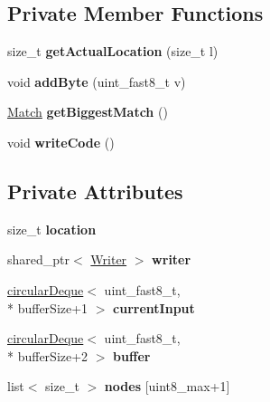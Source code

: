 \subsection*{Private Member Functions}
\begin{DoxyCompactItemize}
\item 
\hypertarget{classCompressWriter_ab0fa055ce027b0f5be42531a285e2217}{size\+\_\+t {\bfseries get\+Actual\+Location} (size\+\_\+t l)}\label{classCompressWriter_ab0fa055ce027b0f5be42531a285e2217}

\item 
\hypertarget{classCompressWriter_a7c45f54c89b0e3ddac53f4ee95effa41}{void {\bfseries add\+Byte} (uint\+\_\+fast8\+\_\+t v)}\label{classCompressWriter_a7c45f54c89b0e3ddac53f4ee95effa41}

\item 
\hypertarget{classCompressWriter_a4e97ecc6a294aa87d685ce422cef6c56}{\hyperlink{structCompressWriter_1_1Match}{Match} {\bfseries get\+Biggest\+Match} ()}\label{classCompressWriter_a4e97ecc6a294aa87d685ce422cef6c56}

\item 
\hypertarget{classCompressWriter_ab958684312e2c0b9be302a1331410210}{void {\bfseries write\+Code} ()}\label{classCompressWriter_ab958684312e2c0b9be302a1331410210}

\end{DoxyCompactItemize}
\subsection*{Private Attributes}
\begin{DoxyCompactItemize}
\item 
\hypertarget{classCompressWriter_ad0c42284addda151ec815efa9eb1b333}{size\+\_\+t {\bfseries location}}\label{classCompressWriter_ad0c42284addda151ec815efa9eb1b333}

\item 
\hypertarget{classCompressWriter_afa45b760576d6845b4f955ea486d603c}{shared\+\_\+ptr$<$ \hyperlink{classWriter}{Writer} $>$ {\bfseries writer}}\label{classCompressWriter_afa45b760576d6845b4f955ea486d603c}

\item 
\hypertarget{classCompressWriter_a4a42d0a68afca7b21ac9edea6a6d465e}{\hyperlink{classcircularDeque}{circular\+Deque}$<$ uint\+\_\+fast8\+\_\+t, \\*
buffer\+Size+1 $>$ {\bfseries current\+Input}}\label{classCompressWriter_a4a42d0a68afca7b21ac9edea6a6d465e}

\item 
\hypertarget{classCompressWriter_a6dea17049f70649520ca9fd02931a5e1}{\hyperlink{classcircularDeque}{circular\+Deque}$<$ uint\+\_\+fast8\+\_\+t, \\*
buffer\+Size+2 $>$ {\bfseries buffer}}\label{classCompressWriter_a6dea17049f70649520ca9fd02931a5e1}

\item 
\hypertarget{classCompressWriter_a130499c9d22e1461044dd4316edfb50c}{list$<$ size\+\_\+t $>$ {\bfseries nodes} \mbox{[}uint8\+\_\+max+1\mbox{]}}\label{classCompressWriter_a130499c9d22e1461044dd4316edfb50c}

\end{DoxyCompactItemize}
